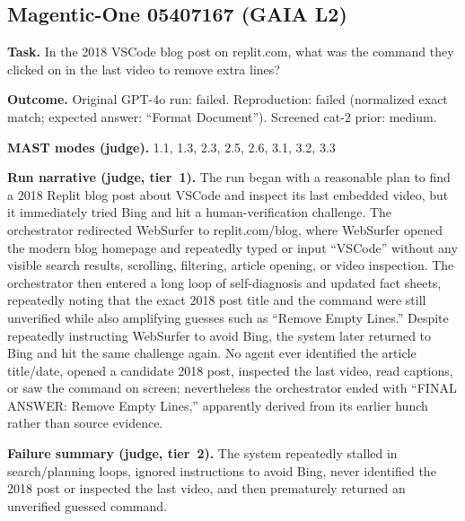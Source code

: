 \subsection*{Magentic-One 05407167 (GAIA L2)}
\textbf{Task.} In the 2018 VSCode blog post on replit.com, what was the command they clicked on in the last video to remove extra lines?

\textbf{Outcome.} Original GPT-4o run: failed. Reproduction: failed (normalized exact match; expected answer: ``Format Document''). Screened cat-2 prior: medium.

\textbf{MAST modes (judge).} 1.1, 1.3, 2.3, 2.5, 2.6, 3.1, 3.2, 3.3

\textbf{Run narrative (judge, tier~1).} The run began with a reasonable plan to find a 2018 Replit blog post about VSCode and inspect its last embedded video, but it immediately tried Bing and hit a human-verification challenge. The orchestrator redirected WebSurfer to replit.com/blog, where WebSurfer opened the modern blog homepage and repeatedly typed or input ``VSCode'' without any visible search results, scrolling, filtering, article opening, or video inspection. The orchestrator then entered a long loop of self-diagnosis and updated fact sheets, repeatedly noting that the exact 2018 post title and the command were still unverified while also amplifying guesses such as ``Remove Empty Lines.'' Despite repeatedly instructing WebSurfer to avoid Bing, the system later returned to Bing and hit the same challenge again. No agent ever identified the article title/date, opened a candidate 2018 post, inspected the last video, read captions, or saw the command on screen; nevertheless the orchestrator ended with ``FINAL ANSWER: Remove Empty Lines,'' apparently derived from its earlier hunch rather than source evidence.

\textbf{Failure summary (judge, tier~2).} The system repeatedly stalled in search/planning loops, ignored instructions to avoid Bing, never identified the 2018 post or inspected the last video, and then prematurely returned an unverified guessed command.

